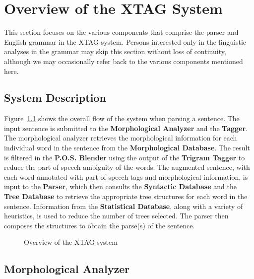 \chapter{Overview of the XTAG System}
\label{overview}

This section focuses on the various components that comprise the
parser and English grammar in the XTAG system.  Persons interested
only in the linguistic analyses in the grammar may skip this section
without loss of continuity, although we may occasionally refer back to
the various components mentioned here.

\section{System Description}

Figure~{\ref{flowchart}} shows the overall flow of the system when parsing a
sentence. The input sentence is submitted to the {\bf Morphological Analyzer}
and the {\bf Tagger}. The morphological analyzer retrieves the morphological
information for each individual word in the sentence from the {\bf
Morphological Database}. The result is filtered in the {\bf P.O.S. Blender}
using the output of the {\bf Trigram Tagger} to reduce the part of speech
ambiguity of the words. The augmented sentence, with each word annotated with
part of speech tags and morphological information, is input to the {\bf
Parser}, which then consults the {\bf Syntactic Database} and the {\bf Tree
Database} to retrieve the appropriate tree structures for each word in the
sentence.  Information from the {\bf Statistical Database}, along with a
variety of heuristics, is used to reduce the number of trees selected. The
parser then composes the structures to obtain the parse(s) of the sentence.

\begin{figure}[htb]
\centering
\mbox{}
{}
\caption{Overview of the XTAG system}
\label{flowchart}
\end{figure}

\section{Morphological Analyzer}

